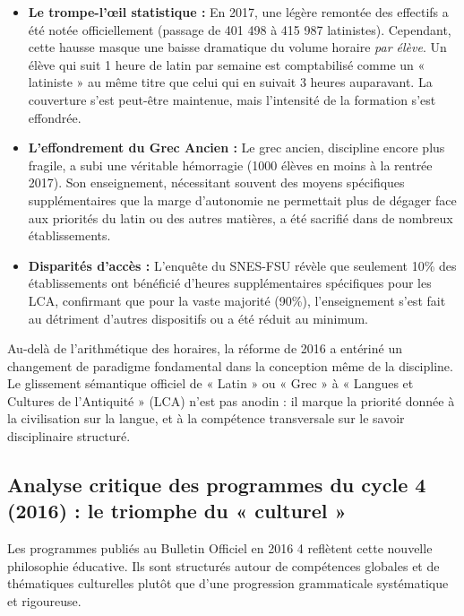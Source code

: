 \begin{itemize}\item \textbf{Le trompe-l'œil statistique :} En 2017, une légère remontée des effectifs a été notée officiellement (passage de 401 498 à 415 987 latinistes).\cite{I-3-2-ref11} Cependant, cette hausse masque une baisse dramatique du volume horaire \textit{par élève}. Un élève qui suit 1 heure de latin par semaine est comptabilisé comme un « latiniste » au même titre que celui qui en suivait 3 heures auparavant. La \og couverture\fg{} s'est peut-être maintenue, mais l'intensité de la formation s'est effondrée.\item \textbf{L'effondrement du Grec Ancien :} Le grec ancien, discipline encore plus fragile, a subi une véritable hémorragie (1000 élèves en moins à la rentrée 2017).\cite{I-3-2-ref11} Son enseignement, nécessitant souvent des moyens spécifiques supplémentaires que la marge d'autonomie ne permettait plus de dégager face aux priorités du latin ou des autres matières, a été sacrifié dans de nombreux établissements.\item \textbf{Disparités d'accès :} L'enquête du SNES-FSU révèle que seulement 10\% des établissements ont bénéficié d'heures supplémentaires spécifiques pour les LCA, confirmant que pour la vaste majorité (90\%), l'enseignement s'est fait au détriment d'autres dispositifs ou a été réduit au minimum.\cite{I-3-2-ref12}\end{itemize}Au-delà de l'arithmétique des horaires, la réforme de 2016 a entériné un changement de paradigme
fondamental dans la conception même de la discipline. Le glissement sémantique officiel de « Latin »
ou « Grec » à « Langues et Cultures de l'Antiquité » (LCA) n'est pas anodin : il marque la priorité
donnée à la civilisation sur la langue, et à la compétence transversale sur le savoir disciplinaire
structuré.



\subsection{Analyse critique des programmes du cycle 4 (2016) : le triomphe du « culturel »}

Les programmes publiés au Bulletin Officiel en 2016 4 reflètent cette nouvelle philosophie
éducative. Ils sont structurés autour de compétences globales et de thématiques culturelles plutôt
que d'une progression grammaticale systématique et rigoureuse.



